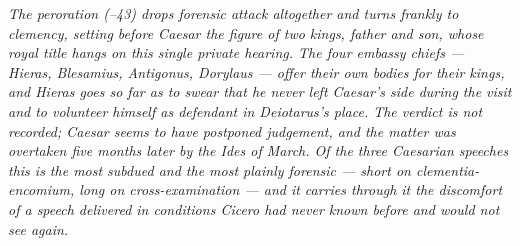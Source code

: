 \textit{The peroration (--43) drops forensic
attack altogether and turns frankly to clemency, setting before
Caesar the figure of two kings, father and son, whose royal
title hangs on this single private hearing. The four embassy
chiefs --- Hieras, Blesamius, Antigonus, Dorylaus --- offer
their own bodies for their kings, and Hieras goes so far as to
swear that he never left Caesar's side during the visit and to
volunteer himself as defendant in Deiotarus's place. The verdict
is not recorded; Caesar seems to have postponed judgement, and
the matter was overtaken five months later by the Ides of March.
Of the three Caesarian speeches this is the most subdued and the
most plainly forensic --- short on \textit{clementia}-encomium,
long on cross-examination --- and it carries through it the
discomfort of a speech delivered in conditions Cicero had never
known before and would not see again.}
